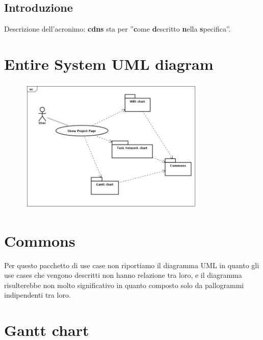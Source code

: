 \documentclass[a4paper, 12pt]{report}
\begin{document}
\newpage

\section*{Introduzione}
Descrizione dell'acronimo: \textbf{cdns} sta per ''\textbf{c}ome
\textbf{d}escritto \textbf{n}ella \textbf{s}pecifica''.

\chapter*{Entire System UML diagram}
\begin{figure}[h!] \centering
\includegraphics[width=0.8\textwidth]{EntireSystem.png} 
\end{figure}

\chapter{Commons}
Per questo pacchetto di use case non riportiamo il diagramma UML in quanto gli
use cases che vengono descritti non hanno relazione tra loro, e il diagramma
risulterebbe non molto significativo in quanto composto solo da pallogrammi
indipendenti tra loro.




\chapter{Gantt chart}
\end{document}
